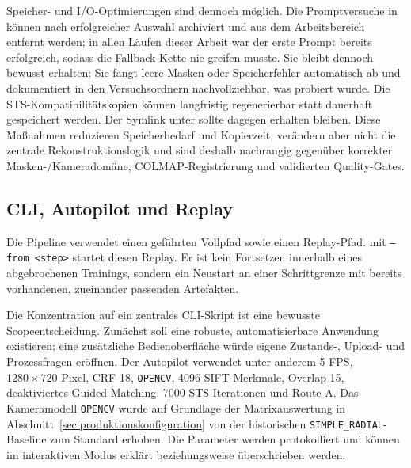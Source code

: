 Speicher- und I/O-Optimierungen sind dennoch möglich. Die Promptversuche in
 können nach erfolgreicher Auswahl archiviert und aus dem
Arbeitsbereich entfernt werden; in allen Läufen dieser Arbeit war der erste
Prompt bereits erfolgreich, sodass die Fallback-Kette nie greifen musste. Sie
bleibt dennoch bewusst erhalten: Sie fängt leere Masken oder Speicherfehler
automatisch ab und dokumentiert in den Versuchsordnern nachvollziehbar, was
probiert wurde. Die STS-Kompatibilitätskopien können langfristig
regenerierbar statt dauerhaft gespeichert werden. Der Symlink unter
 sollte dagegen erhalten bleiben. Diese Maßnahmen
reduzieren Speicherbedarf und Kopierzeit, verändern aber nicht die zentrale
Rekonstruktionslogik und sind deshalb nachrangig gegenüber korrekter
Masken-/Kameradomäne, COLMAP-Registrierung und validierten Quality-Gates.

\subsection{CLI, Autopilot und Replay}

Die Pipeline verwendet einen geführten Vollpfad sowie einen Replay-Pfad.
 mit \texttt{--from <step>} startet diesen Replay. Er
ist kein Fortsetzen innerhalb eines abgebrochenen Trainings, sondern ein
Neustart an einer
Schrittgrenze mit bereits vorhandenen, zueinander passenden Artefakten.

Die Konzentration auf ein zentrales CLI-Skript ist eine bewusste
Scopeentscheidung. Zunächst soll eine robuste, automatisierbare Anwendung
existieren; eine zusätzliche Bedienoberfläche würde eigene Zustands-, Upload-
und Prozessfragen eröffnen. Der Autopilot verwendet unter anderem 5 FPS,
$1280\times720$ Pixel, CRF 18, \texttt{OPENCV}, 4096 SIFT-Merkmale,
Overlap 15, deaktiviertes Guided Matching, 7000 STS-Iterationen und Route A.
Das Kameramodell \texttt{OPENCV} wurde auf Grundlage der Matrixauswertung in
Abschnitt~\ref{sec:produktionskonfiguration} von der historischen
\texttt{SIMPLE\_RADIAL}-Baseline zum Standard erhoben. Die Parameter werden
protokolliert und können im interaktiven Modus erklärt beziehungsweise
überschrieben werden.

